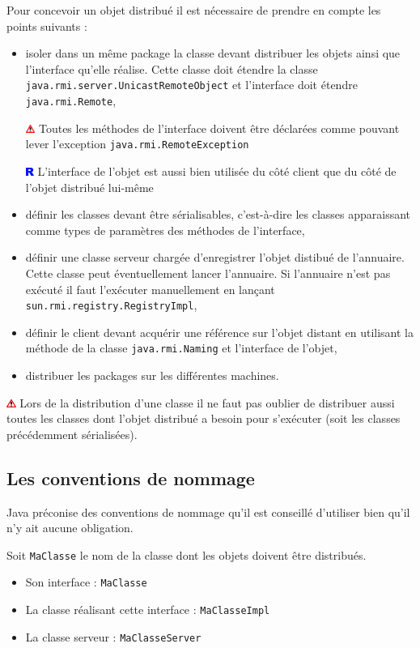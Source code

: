 \documentclass[a4paper,11pt]{report}
\newcommand{\attention}[1]{
	\begin{center}
	\medskip
	\colorbox{attention}{
		\begin{minipage}{0.8\textwidth}\medskip\includegraphics[height=10px]{images/attention.png} #1 \medskip\end{minipage}
	}
	\medskip
	\end{center}
}
\newcommand{\remarque}[1]{
	\begin{center}
	\medskip
	\colorbox{remarque}{
		\begin{minipage}{0.8\textwidth}\medskip\includegraphics[height=10px]{images/remarque.png} #1 \medskip\end{minipage}
	}
	\medskip
	\end{center}
}
\begin{document}
Pour concevoir un objet distribué il est nécessaire de prendre en compte les points suivants :
\begin{itemize}
\item isoler dans un même package la classe devant distribuer les objets ainsi que l\rq{}interface qu\rq{}elle réalise. Cette classe doit étendre la classe \texttt{java.rmi.server.UnicastRemoteObject} et l\rq{}interface doit étendre \texttt{java.rmi.Remote},
\attention{Toutes les méthodes de l\rq{}interface doivent être déclarées comme pouvant lever l\rq{}exception \texttt{java.rmi.RemoteException}}
\remarque{L\rq{}interface de l\rq{}objet est aussi bien utilisée du côté client que du côté de l\rq{}objet distribué lui-même}
\item définir les classes devant être sérialisables, c\rq{}est-à-dire les classes apparaissant comme types de paramètres des méthodes de l\rq{}interface,
\item définir une classe serveur chargée d\rq{}enregistrer l\rq{}objet distibué de l\rq{}annuaire. Cette classe peut éventuellement lancer l\rq{}annuaire. Si l\rq{}annuaire n\rq{}est pas exécuté il faut l\rq{}exécuter manuellement en lançant \texttt{sun.rmi.registry.RegistryImpl},
\item définir le client devant acquérir une référence sur l\rq{}objet distant en utilisant la méthode de la classe \texttt{java.rmi.Naming} et l\rq{}interface de l\rq{}objet,
\item distribuer les packages sur les différentes machines.
\end{itemize}

\attention{Lors de la distribution d\rq{}une classe il ne faut pas oublier de distribuer aussi toutes les classes dont l\rq{}objet distribué a besoin pour s\rq{}exécuter (soit les classes précédemment sérialisées).}


\subsection{Les conventions de nommage}

Java préconise des conventions de nommage qu\rq{}il est conseillé d\rq{}utiliser bien qu\rq{}il n\rq{}y ait aucune obligation.

Soit \texttt{MaClasse} le nom de la classe dont les objets doivent être distribués.
\begin{itemize}
\item Son interface : \texttt{MaClasse}
\item La classe réalisant cette interface : \texttt{MaClasseImpl}
\item La classe serveur : \texttt{MaClasseServer}
\end{itemize}
\end{document}
